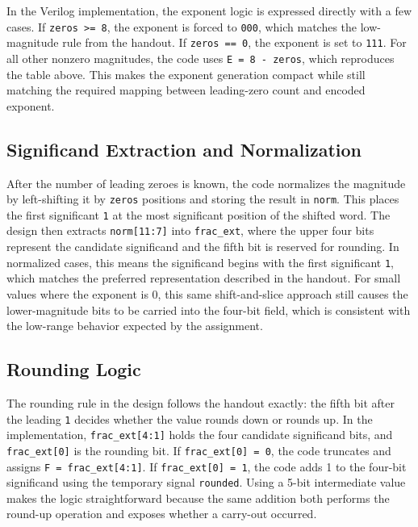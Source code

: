 \documentclass[10pt,letterpaper]{article}
\begin{document}
In the Verilog implementation, the exponent logic is expressed directly with a few cases. If \texttt{zeros >= 8}, the exponent is forced to \texttt{000}, which matches the low-magnitude rule from the handout. If \texttt{zeros == 0}, the exponent is set to \texttt{111}. For all other nonzero magnitudes, the code uses \texttt{E = 8 - zeros}, which reproduces the table above. This makes the exponent generation compact while still matching the required mapping between leading-zero count and encoded exponent.

\subsection{Significand Extraction and Normalization}

After the number of leading zeroes is known, the code normalizes the magnitude by left-shifting it by \texttt{zeros} positions and storing the result in \texttt{norm}. This places the first significant \texttt{1} at the most significant position of the shifted word. The design then extracts \texttt{norm[11:7]} into \texttt{frac\_ext}, where the upper four bits represent the candidate significand and the fifth bit is reserved for rounding. In normalized cases, this means the significand begins with the first significant \texttt{1}, which matches the preferred representation described in the handout. For small values where the exponent is 0, this same shift-and-slice approach still causes the lower-magnitude bits to be carried into the four-bit field, which is consistent with the low-range behavior expected by the assignment.

\subsection{Rounding Logic}

The rounding rule in the design follows the handout exactly: the fifth bit after the leading \texttt{1} decides whether the value rounds down or rounds up. In the implementation, \texttt{frac\_ext[4:1]} holds the four candidate significand bits, and \texttt{frac\_ext[0]} is the rounding bit. If \texttt{frac\_ext[0] = 0}, the code truncates and assigns \texttt{F = frac\_ext[4:1]}. If \texttt{frac\_ext[0] = 1}, the code adds 1 to the four-bit significand using the temporary signal \texttt{rounded}. Using a 5-bit intermediate value makes the logic straightforward because the same addition both performs the round-up operation and exposes whether a carry-out occurred.
\end{document}

